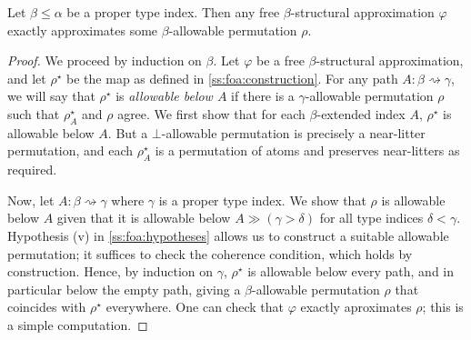 \begin{theorem*}
    Let \( \beta \leq \alpha \) be a proper type index.
    Then any free \( \beta \)-structural approximation \( \varphi \) exactly approximates some \( \beta \)-allowable permutation \( \rho \).
\end{theorem*}
\begin{proof}
    We proceed by induction on \( \beta \).
    Let \( \varphi \) be a free \( \beta \)-structural approximation, and let \( \rho^\star \) be the map as defined in \cref{ss:foa:construction}.
    For any path \( A : \beta \rightsquigarrow \gamma \), we will say that \( \rho^\star \) is \emph{allowable below \( A \)} if there is a \( \gamma \)-allowable permutation \( \rho \) such that \( \rho^\star_A \) and \( \rho \) agree.
    We first show that for each \( \beta \)-extended index \( A \), \( \rho^\star \) is allowable below \( A \).
    But a \( \bot \)-allowable permutation is precisely a near-litter permutation, and each \( \rho^\star_A \) is a permutation of atoms and preserves near-litters as required.

    Now, let \( A : \beta \rightsquigarrow \gamma \) where \( \gamma \) is a proper type index.
    We show that \( \rho \) is allowable below \( A \) given that it is allowable below \( A \gg (\gamma > \delta) \) for all type indices \( \delta < \gamma \).
    Hypothesis (v) in \cref{ss:foa:hypotheses} allows us to construct a suitable allowable permutation; it suffices to check the coherence condition, which holds by construction.
    Hence, by induction on \( \gamma \), \( \rho^\star \) is allowable below every path, and in particular below the empty path, giving a \( \beta \)-allowable permutation \( \rho \) that coincides with \( \rho^\star \) everywhere.
    One can check that \( \varphi \) exactly aproximates \( \rho \); this is a simple computation.
\end{proof}
